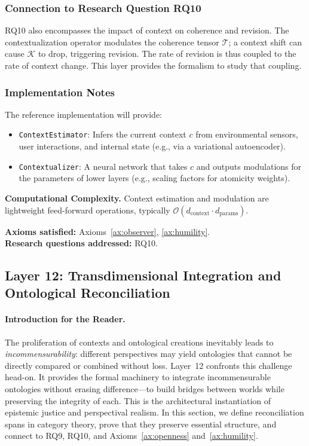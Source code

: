 \subsubsection{Connection to Research Question RQ10}
RQ10 also encompasses the impact of context on coherence and revision. The contextualization operator modulates the coherence tensor $\mathcal{T}$; a context shift can cause $\mathcal{K}$ to drop, triggering revision. The rate of revision is thus coupled to the rate of context change. This layer provides the formalism to study that coupling.

\subsubsection{Implementation Notes}
The reference implementation will provide:
\begin{itemize}
    \item \texttt{ContextEstimator}: Infers the current context $c$ from environmental sensors, user interactions, and internal state (e.g., via a variational autoencoder).
    \item \texttt{Contextualizer}: A neural network that takes $c$ and outputs modulations for the parameters of lower layers (e.g., scaling factors for atomicity weights).
\end{itemize}

\textbf{Computational Complexity.} Context estimation and modulation are lightweight feed-forward operations, typically $\mathcal{O}(d_{\text{context}} \cdot d_{\text{params}})$.

\textbf{Axioms satisfied:} Axioms~\ref{ax:observer}, \ref{ax:humility}. \\
\textbf{Research questions addressed:} RQ10.

\subsection{Layer 12: Transdimensional Integration and Ontological Reconciliation}
\label{subsec:layer12}

\paragraph{Introduction for the Reader.}
The proliferation of contexts and ontological creations inevitably leads to \emph{incommensurability}: different perspectives may yield ontologies that cannot be directly compared or combined without loss. Layer~12 confronts this challenge head-on. It provides the formal machinery to integrate incommensurable ontologies without erasing difference—to build bridges between worlds while preserving the integrity of each. This is the architectural instantiation of epistemic justice \cite{fricker2007} and perspectival realism. In this section, we define reconciliation spans in category theory, prove that they preserve essential structure, and connect to RQ9, RQ10, and Axioms~\ref{ax:openness} and~\ref{ax:humility}.

